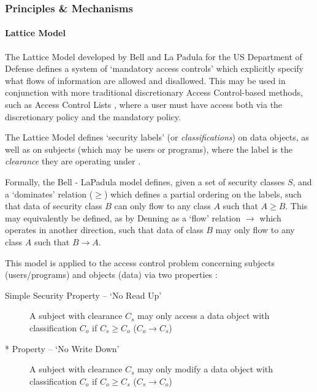 \pagebreak

\subsubsection{Principles \& Mechanisms}

	\paragraph{Lattice Model}
	
	The Lattice Model developed by Bell and La Padula for the US Department of Defense \cite{bell1976lattice} defines a system of `mandatory access controls' which explicitly specify what flows of information are allowed and disallowed. This may be used in conjunction with more traditional discretionary Access Control-based methods, such as Access Control Lists \cite{sandhu1993lattice}, where a user must have access both via the discretionary policy and the mandatory policy.
	
	The Lattice Model defines `security labels' (or \textit{classifications}) on data objects, as well as on subjects (which may be users or programs), where the label is the \textit{clearance} they are operating under \cite{denning1976lattice}.
	
	Formally, the Bell - LaPadula model defines, given a set of security classes $ S $, and a `dominates' relation ($ \ge $) \cite{sandhu1993lattice} which defines a partial ordering on the labels, such that data of security class $ B $ can only flow to any class $ A $ such that $ A \ge B $. This may equivalently be defined, as by Denning \cite{denning1976lattice} as a `flow' relation $ \rightarrow $ which operates in another direction, such that data of class $ B $ may only flow to any class $ A $ such that $ B \rightarrow A $.
	
	This model is applied to the access control problem concerning subjects (users/programs) and objects (data) via two properties \cite{bell1973lattice}:
	
	\begin{description}
		\item[Simple Security Property -- `No Read Up'] A subject with clearance $ C_s $ may only access a data object with classification $ C_o $ if $ C_s \ge C_o $ ($ C_o \rightarrow C_s $)
		\item[* Property -- `No Write Down'] A subject with clearance $ C_s $ may only modify a data object with classification $ C_o $ if $ C_o \ge C_s $ ($ C_s \rightarrow C_o $)
	\end{description}
	
